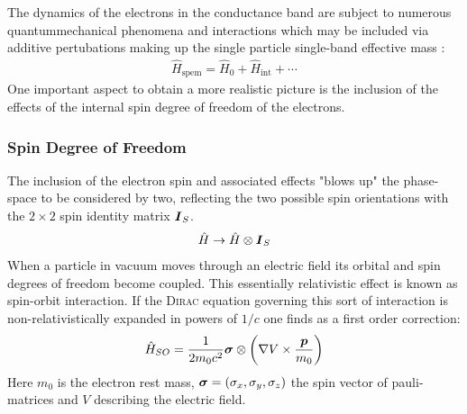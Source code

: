 The dynamics of the electrons in the conductance band are subject to numerous quantummechanical phenomena and interactions which may be included via additive pertubations making up the single particle single-band effective mass \hamil{}:
\begin{align}
\hat{H}_{\text{spem}} = \hat{H}_0 + \hat{H}_{\text{int}}+\dotsb \label{eqn:generalhamil}
\end{align}
One important aspect to obtain a more realistic picture is the inclusion of the effects of the internal spin degree of freedom of the electrons.
\subsubsection{Spin Degree of Freedom}
The inclusion of the electron spin and associated effects "blows up" the phase-space to be considered by two, reflecting the two possible spin orientations with the $2 \times 2$ spin identity matrix $\boldsymbol{I}_S$. 
\begin{align}
\hat{H} \rightarrow \hat{H} \otimes \boldsymbol{I}_S
\end{align}
When a particle in vacuum moves through an electric field its orbital and spin degrees of freedom become coupled. This essentially relativistic effect is known as spin-orbit interaction. If the \textsc{Dirac} equation governing this sort of interaction is non-relativistically expanded in powers of $1/c$ one finds as a first order correction\cite{Nowack2009Thesis}:
\begin{align}
\hat{H}_{SO} = \frac{1}{2m_0c^2} \boldsymbol{\sigma} \otimes \left( \nabla V \times \frac{\boldsymbol{p}}{m_0}\right)
\label{eqn:spinorbithamil}
\end{align}
Here $m_0$ is the electron rest mass, $\boldsymbol{\sigma} = (\sigma_x, \sigma_y,\sigma_z)$ the spin vector of pauli-matrices and $V$ describing the electric field. 
